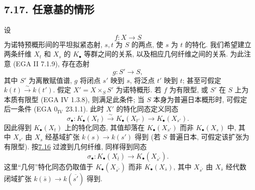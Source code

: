 \subsection*{7.17. 任意基的情形} 设
%
\[
f:X\longrightarrow S
\]
为诺特预概形间的平坦拟紧态射, $s,t$ 为 $S$ 的两点, 使 $s$ 为 $t$ 的特化. 我们希望建立两条纤维 $X_t$ 和 $X_s$ 的 $K_\bullet$ 等群之间的关系, 以及相应几何纤维之间的关系. 为此注意 (EGA II 7.1.9), 存在态射
%
%
%
%
\[
g:S'\longrightarrow S,
\]
其中 $S'$ 为离散赋值谱, $g$ 将闭点 $s'$ 映到 $s$, 将泛点 $t'$ 映到 $t$; 甚至可假定 $k(t)\xrightarrow{\sim}k(t')$. 假定 $X'=X\times_SS'$ 为诺特概形. 若 $f$ 为有限型, 或 $S'$ 在 $S$ 上为本质有限型 (EGA IV 1.3.8), 则满足此条件; 当 $S$ 本身为普遍日本概形时, 可假定后一条件 (EGA $0_{\mathrm{IV}}$ 23.1.1). 此时 $X'$ 的特化同态定义同态
%
%
%
%
%
%
\begin{equation}\tag{7.17.1}
\sigma_\bullet:K_\bullet(X_t)\xrightarrow{\sim}K_\bullet(X_{t'})
  \longrightarrow K_\bullet(X_{s'}).
\end{equation}
因此得到 $K_\bullet(X_t)$ 上的特化同态, 其值却落在 $K_\bullet(X_{s'})$ 而非 $K_\bullet(X_s)$ 中, 其中 $X_{s'}$ 由 $X_s$ 经基域扩张 $k(s)\to k(s')$ 得到 (若 $S$ 普遍日本, 可假定该扩张为有限型). 按\hyperlink{sga6.e10.sec.7.16}{7.16} 过渡到几何纤维, 同样得到同态
%
%
%
%
%
\begin{equation}\tag{7.17.2}
\sigma_\bullet:K_\bullet(X_{\bar t})
  \longrightarrow K_\bullet(X_{\overline{s'}}).
\end{equation}
这里“几何”特化同态仍取值于 $K_\bullet(X_{\overline{s'}})$ 而非 $K_\bullet(X_{\bar s})$, 其中 $X_{\overline{s'}}$ 由 $X_{\bar s}$ 经代数闭域扩张 $k(\bar s)\to k(\overline{s'})$ 得到.
%
%
%
%

